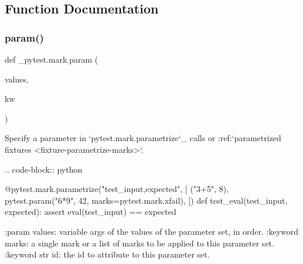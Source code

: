 \subsection{Function Documentation}
\mbox{\label{namespace__pytest_1_1mark_accf86ce8219b1b4a565453330568b6b8}} 
\subsubsection{\texorpdfstring{param()}{param()}}
{\footnotesize\ttfamily def \+\_\+pytest.\+mark.\+param (\begin{DoxyParamCaption}\item[{}]{values,  }\item[{}]{kw }\end{DoxyParamCaption})}

\begin{DoxyVerb}Specify a parameter in `pytest.mark.parametrize`_ calls or
:ref:`parametrized fixtures <fixture-parametrize-marks>`.

.. code-block:: python

    @pytest.mark.parametrize("test_input,expected", [
        ("3+5", 8),
        pytest.param("6*9", 42, marks=pytest.mark.xfail),
    ])
    def test_eval(test_input, expected):
        assert eval(test_input) == expected

:param values: variable args of the values of the parameter set, in order.
:keyword marks: a single mark or a list of marks to be applied to this parameter set.
:keyword str id: the id to attribute to this parameter set.
\end{DoxyVerb}
 